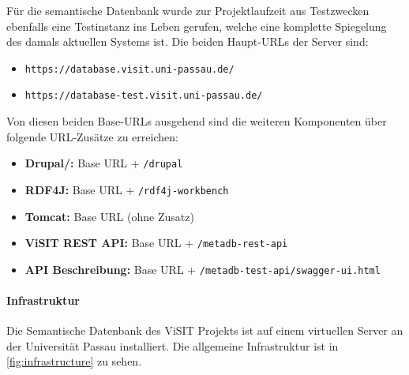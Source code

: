 Für die semantische Datenbank wurde zur Projektlaufzeit aus Testzwecken ebenfalls eine Testinstanz ins Leben gerufen, welche eine komplette Spiegelung des damals aktuellen Systems ist. Die beiden Haupt-URLs der Server sind:

\begin{itemize}
	\item \texttt{https://database.visit.uni-passau.de/}
	\item \texttt{https://database-test.visit.uni-passau.de/}
\end{itemize}

Von diesen beiden Base-URLs ausgehend sind die weiteren Komponenten über folgende URL-Zusätze zu erreichen:

\begin{itemize}
	\item \textbf{Drupal/\wisski:} Base URL + \texttt{/drupal}
	\item \textbf{RDF4J:} Base URL + \texttt{/rdf4j-workbench}
	\item \textbf{Tomcat:} Base URL (ohne Zusatz)
	\item \textbf{ViSIT REST API:} Base URL + \texttt{/metadb-rest-api}
	\item \textbf{API Beschreibung:} Base URL + \texttt{/metadb-test-api/swagger-ui.html}
\end{itemize}

\paragraph{Infrastruktur}

Die Semantische Datenbank des ViSIT Projekts ist auf einem virtuellen Server an der Universität Passau installiert. Die allgemeine Infrastruktur ist in \autoref{fig:infrastructure} zu sehen.

